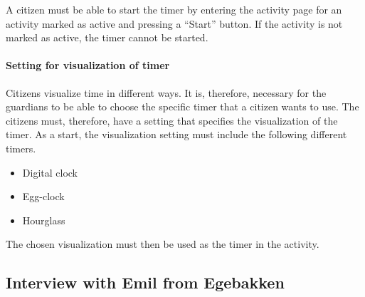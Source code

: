 A citizen must be able to start the timer by entering the activity page for an activity marked as active and pressing a “Start” button. If the activity is not marked as active, the timer cannot be started.

\paragraph{Setting for visualization of timer}

Citizens visualize time in different ways. It is, therefore, necessary for the guardians to be able to choose the specific timer that a citizen wants to use. The citizens must, therefore, have a setting that specifies the visualization of the timer. As a start, the visualization setting must include the following different timers.

\begin{itemize}
    \item Digital clock
    \item Egg-clock
    \item Hourglass
\end{itemize}
The chosen visualization must then be used as the timer in the activity.



\subsection{Interview with Emil from Egebakken}


